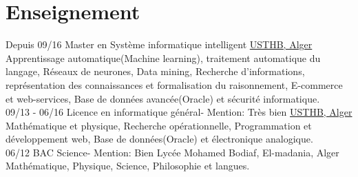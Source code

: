 \documentclass[]{friggeri-cv}
\begin{document}
\section{Enseignement}
\begin{entrylist}
  \entry
    {Depuis 09/16}
    {Master en  Système informatique intelligent}
    {\href{http://www.usthb.dz/IMG/pdf/Master-SII.pdf}{USTHB, Alger}}
    {Apprentissage automatique(Machine learning), traitement automatique du langage, Réseaux de neurones, Data mining, Recherche d'informations, représentation des connaissances et formalisation du raisonnement,  E-commerce et web-services, Base de données avancée(Oracle) et sécurité informatique.\\}
  \entry
    {09/13 - 06/16}
    {Licence en informatique général- Mention: Très bien}
    {\href{http://www.usthb.dz/spip.php?article47}{USTHB, Alger}}
    {Mathématique et physique, Recherche opérationnelle, Programmation et développement web,  Base de données(Oracle) et électronique analogique.\\}
  \entry
    {06/12}
    {BAC Science- Mention: Bien}
    {Lycée Mohamed Bodiaf, El-madania, Alger}
    {Mathématique, Physique, Science, Philosophie et langues.}
\end{entrylist}

\vspace{0.5cm}
\end{document}
